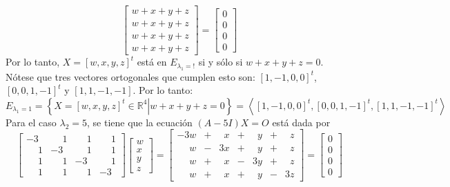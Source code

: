 \begin{solucion}
\begin{equation*}
\begin{bmatrix}
   w + x + y + z \\
   w + x + y + z \\
   w + x + y + z \\
   w + x + y + z 
  \end{bmatrix}
  =
  \begin{bmatrix}
   0 \\ 0 \\ 0 \\ 0
  \end{bmatrix}
 \end{equation*}
 Por lo tanto, $X=[w,x,y,z]^t$ est\'a en $E_{\lambda_1=!}$ si y s\'olo si $w+x+y+z=0$. N\'otese que tres vectores ortogonales que cumplen esto son: $[1,-1,0,0]^t$, $[0,0,1,-1]^t$ y $[1,1,-1,-1]$. Por lo tanto:
 \begin{equation*}
  E_{\lambda_1  = 1} = \left\{ \left. X = [w,x,y,z]^t \in \mathbb{R}^4 \right| w+x+y+z=0 \right\} = \left< [1,-1,0,0]^t, [0,0,1,-1]^t, [1,1,-1,-1]^t \right>
 \end{equation*}
 Para el caso $\lambda_2 = 5$, se tiene que la ecuaci\'on $(A-5I)X = O$ est\'a dada por
 \begin{equation*}
  \begin{bmatrix}
   -3 &  \phantom{-}1 &  \phantom{-}1 &  \phantom{-}1 \\
    \phantom{-}1 & -3 &  \phantom{-}1 &  \phantom{-}1 \\
    \phantom{-}1 &  \phantom{-}1 & -3 &  \phantom{-}1 \\
    \phantom{-}1 &  \phantom{-}1 &  \phantom{-}1 & -3
  \end{bmatrix}
  \begin{bmatrix}
   w \\ x \\ y \\ z
  \end{bmatrix}
  = 
  \begin{bmatrix}
   -3w & + & \phantom{3}x & + & \phantom{3}y & + & \phantom{3}z \\
   \phantom{-3}w & - & 3x & + & \phantom{3}y & + & \phantom{3}z \\
   \phantom{-3}w & + & \phantom{3}x & - & 3y & + & \phantom{3}z \\
   \phantom{-3}w & + & \phantom{3}x & + & \phantom{3}y & - & 3z
  \end{bmatrix}
  = 
  \begin{bmatrix}
   0 \\ 0 \\ 0 \\ 0

\end{bmatrix}
\end{equation*}
\end{solucion}
